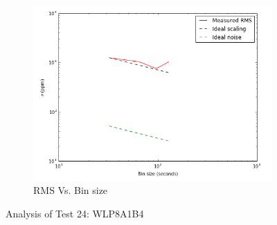 \documentclass{aastex6}
\begin{document}
\begin{figure}[H]
    \begin{subfigure}{3}
        \includegraphics[scale=0.6]{rms_test24}
        \caption{RMS Vs. Bin size}
    \end{subfigure}
    \caption{Analysis of Test 24: WLP8A1B4}
\end{figure}
\end{document}
